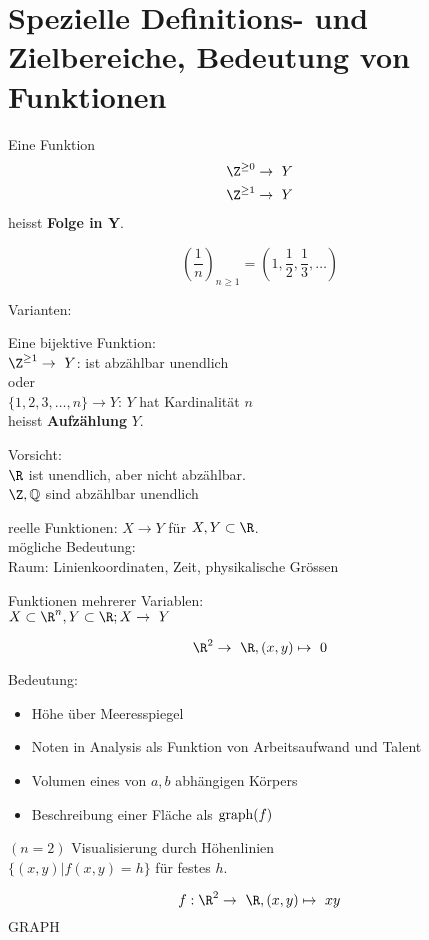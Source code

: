 \section{Spezielle Definitions- und Zielbereiche, Bedeutung von Funktionen}
\begin{def*}[note = Folge , index = Folge]
Eine Funktion
	\begin{gather*}
		\Z^{\geq 0} \rightarrow Y \\
		\Z^{\geq 1} \rightarrow Y
	\end{gather*}
	heisst \textbf{Folge in Y}.\\
\end{def*}
\begin{bsp*}
	\[ \left( \frac{1}{n} \right)_{n \geq 1} = \left( 1 , \frac{1}{2} , \frac{1}{3} , \dotsc \right) \]
\end{bsp*}
Varianten:\\
\begin{def*}[note = Aufzählung , index = Aufzählung]
	Eine bijektive Funktion:\\
	$\Z^{\geq 1} \rightarrow Y$: ist abzählbar unendlich \\
	oder \\
	$\{ 1 , 2 , 3 , \dotsc , n \} \rightarrow Y$: $Y$ hat Kardinalität $n$\\
	heisst \textbf{Aufzählung} $Y$.
\end{def*}
\begin{bem}
	Vorsicht: \\
	$\R$ ist unendlich, aber nicht abzählbar.\\
	$\Z , \Q$ sind abzählbar unendlich
\end{bem}
reelle Funktionen: $X \rightarrow Y$ für $X, Y \subset \R$.\\
mögliche Bedeutung:\\
Raum: Linienkoordinaten, Zeit, physikalische Grössen

Funktionen mehrerer Variablen: \\
$X \subset \R^n , Y \subset \R ; X \rightarrow Y$\\
\begin{bsp*}
	\[ \R^2 \rightarrow \R , (x,y) \mapsto 0 \]
\end{bsp*}
Bedeutung:
\begin{itemize}
	\item Höhe über Meeresspiegel
	\item Noten in Analysis als Funktion von Arbeitsaufwand und Talent
	\item Volumen eines von $a,b$ abhängigen Körpers
	\item Beschreibung einer Fläche als $\operatorname{graph}(f)$
\end{itemize}
$(n=2)$ Visualisierung durch Höhenlinien\\
$\{ (x,y) | f(x,y) = h \}$ für festes $h$.\\
\begin{bsp*}
	\[ f: \R^2 \rightarrow \R , (x,y) \mapsto xy \]
	GRAPH
\end{bsp*}

